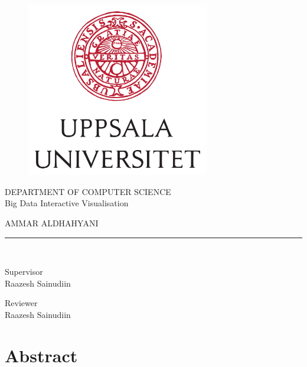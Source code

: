 \documentclass[svgnames]{article}
\begin{document}
\begin{titlepage}
\begin{center}
\vspace*{-1in}
\begin{figure}[htb]
\begin{center}
\includegraphics[width=8cm]{UU_logo.jpg}
\end{center}
\end{figure}

DEPARTMENT OF COMPUTER SCIENCE \\
\vspace*{0.15in}
Big Data Interactive Visualisation\\
\vspace*{0.3in}
\begin{large}
AMMAR ALDHAHYANI\\
\end{large}
\vspace*{0.1in}
\rule{80mm}{0.1mm}\\
\vspace*{0.1in}
\begin{large}
Supervisor \\
Raazesh Sainudiin
\end{large}
\begin{large}
Reviewer \\
Raazesh Sainudiin
\end{large}
\end{center}
\end{titlepage}

\tableofcontents
\newpage

\section{Abstract}
\end{document}
